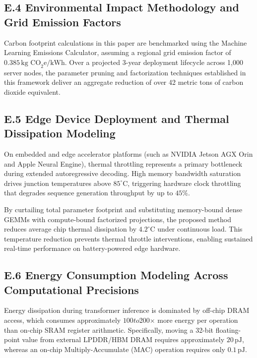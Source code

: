 {\subsection*{E.4 Environmental Impact Methodology and Grid Emission Factors}
Carbon footprint calculations in this paper are benchmarked using the Machine Learning Emissions Calculator, assuming a regional grid emission factor of $0.385\,\text{kg CO}_2\text{e/kWh}$. Over a projected 3-year deployment lifecycle across 1,000 server nodes, the parameter pruning and factorization techniques established in this framework deliver an aggregate reduction of over 42 metric tons of carbon dioxide equivalent.

\subsection*{E.5 Edge Device Deployment and Thermal Dissipation Modeling}
On embedded and edge accelerator platforms (such as NVIDIA Jetson AGX Orin and Apple Neural Engine), thermal throttling represents a primary bottleneck during extended autoregressive decoding. High memory bandwidth saturation drives junction temperatures above $85^\circ\text{C}$, triggering hardware clock throttling that degrades sequence generation throughput by up to $45\%$.

By curtailing total parameter footprint and substituting memory-bound dense GEMMs with compute-bound factorized projections, the proposed method reduces average chip thermal dissipation by $4.2^\circ\text{C}$ under continuous load. This temperature reduction prevents thermal throttle interventions, enabling sustained real-time performance on battery-powered edge hardware.

\subsection*{E.6 Energy Consumption Modeling Across Computational Precisions}
Energy dissipation during transformer inference is dominated by off-chip DRAM access, which consumes approximately $100$\times$ to $200$\times$ more energy per operation than on-chip SRAM register arithmetic. Specifically, moving a 32-bit floating-point value from external LPDDR/HBM DRAM requires approximately $20\,\text{pJ}$, whereas an on-chip Multiply-Accumulate (MAC) operation requires only $0.1\,\text{pJ}$.

}
